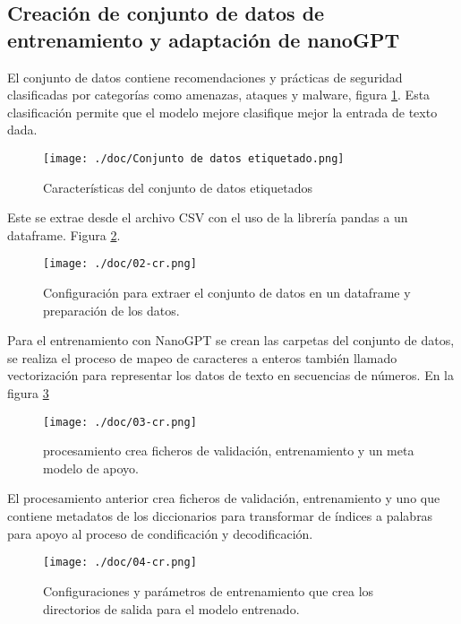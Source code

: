 
\subsection{Creación de conjunto de datos de entrenamiento y adaptación de nanoGPT}\label{section:Creación de conjunto de datos con fuentes de internet} 
El conjunto de datos contiene recomendaciones y prácticas de seguridad clasificadas por categorías como amenazas, ataques y malware, figura \ref{figure:Conjunto de datos}. Esta clasificación permite que el modelo mejore clasifique mejor la entrada de texto dada.
\begin{figure}[H]
   \centering %
       \texttt{[image: ./doc/Conjunto de datos etiquetado.png]} 
   \caption{Características del conjunto de datos etiquetados \cite{}}
  \label{figure:Conjunto de datos}  %
\end{figure}
Este se extrae desde el archivo CSV con el uso de la librería pandas a un dataframe. Figura \ref{figure:Extracción de datos del csv}.\cite{Reiss2021}
\begin{figure}[H]
   \centering %
       \texttt{[image: ./doc/02-cr.png]} 
   \caption{Configuración para extraer el conjunto de datos en un dataframe y preparación de los datos.  \cite{}}
  \label{figure:Extracción de datos del csv}  %
\end{figure}
\clearpage
Para el entrenamiento con NanoGPT se crean las carpetas del conjunto de datos, se realiza el proceso de mapeo de caracteres a enteros también llamado vectorización para representar los datos de texto en secuencias de números. \cite{GenerGediz2020}
En la figura \ref{figure:Etapa de encoder}
\begin{figure}[H]
   \centering %
       \texttt{[image: ./doc/03-cr.png]} 
   \caption{procesamiento crea  ficheros de validación, entrenamiento y un meta modelo de apoyo.  \cite{}}
  \label{figure:Etapa de encoder}  %
\end{figure}
El procesamiento anterior crea ficheros de validación, entrenamiento y uno que contiene metadatos de los diccionarios para transformar de índices a palabras para apoyo al proceso de condificación y decodificación.
\begin{figure}[H]
   \centering %
       \texttt{[image: ./doc/04-cr.png]} 
   \caption{Configuraciones y parámetros de entrenamiento que crea los directorios de salida para el modelo entrenado.  \cite{}}
  \label{figure:Configuraciónes de parámetros}  %
\end{figure}
\clearpage
